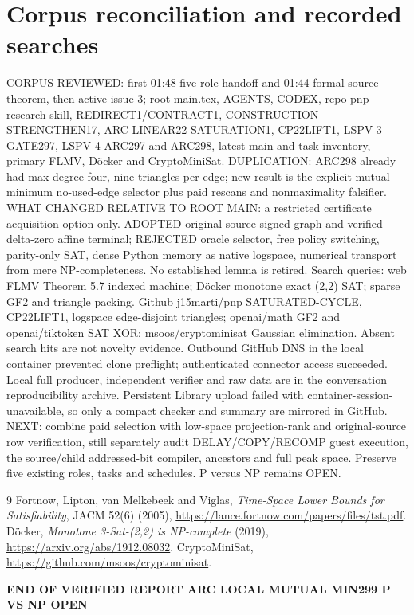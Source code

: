 \documentclass[10pt]{article}
\begin{document}
\section{Corpus reconciliation and recorded searches}
CORPUS REVIEWED: first 01:48 five-role handoff and 01:44 formal source theorem, then active issue 3; root main.tex, AGENTS, CODEX, repo pnp-research skill, REDIRECT1/CONTRACT1, CONSTRUCTION-STRENGTHEN17, ARC-LINEAR22-SATURATION1, CP22LIFT1, LSPV-3 GATE297, LSPV-4 ARC297 and ARC298, latest main and task inventory, primary FLMV, D\"ocker and CryptoMiniSat. DUPLICATION: ARC298 already had max-degree four, nine triangles per edge; new result is the explicit mutual-minimum no-used-edge selector plus paid rescans and nonmaximality falsifier. WHAT CHANGED RELATIVE TO ROOT MAIN: a restricted certificate acquisition option only. ADOPTED original source signed graph and verified delta-zero affine terminal; REJECTED oracle selector, free policy switching, parity-only SAT, dense Python memory as native logspace, numerical transport from mere NP-completeness. No established lemma is retired.
Search queries: web FLMV Theorem 5.7 indexed machine; D\"ocker monotone exact (2,2) SAT; sparse GF2 and triangle packing. Github j15marti/pnp SATURATED-CYCLE, CP22LIFT1, logspace edge-disjoint triangles; openai/math GF2 and openai/tiktoken SAT XOR; msoos/cryptominisat Gaussian elimination. Absent search hits are not novelty evidence. Outbound GitHub DNS in the local container prevented clone preflight; authenticated connector access succeeded. Local full producer, independent verifier and raw data are in the conversation reproducibility archive. Persistent Library upload failed with container-session-unavailable, so only a compact checker and summary are mirrored in GitHub.
NEXT: combine paid selection with low-space projection-rank and original-source row verification, still separately audit DELAY/COPY/RECOMP guest execution, the source/child addressed-bit compiler, ancestors and full peak space. Preserve five existing roles, tasks and schedules. P versus NP remains OPEN.
\begin{thebibliography}{9}
 Fortnow, Lipton, van Melkebeek and Viglas, \emph{Time-Space Lower Bounds for Satisfiability}, JACM 52(6) (2005), \url{https://lance.fortnow.com/papers/files/tst.pdf}.
 D\"ocker, \emph{Monotone 3-Sat-(2,2) is NP-complete} (2019), \url{https://arxiv.org/abs/1912.08032}.
 CryptoMiniSat, \url{https://github.com/msoos/cryptominisat}.
\end{thebibliography}
\noindent\textbf{END OF VERIFIED REPORT ARC LOCAL MUTUAL MIN299 P VS NP OPEN}
\end{document}
